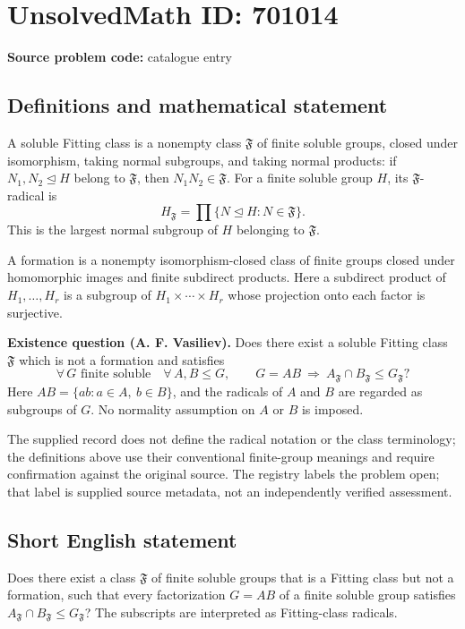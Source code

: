 \documentclass[11pt]{article}
\begin{document}
\section*{UnsolvedMath ID: 701014}
\textbf{Source problem code:} catalogue entry
\subsection{Definitions and mathematical statement}
A soluble Fitting class is a nonempty class \(\mathfrak F\) of finite soluble groups, closed under isomorphism, taking normal subgroups, and taking normal products: if \(N_1,N_2\trianglelefteq H\) belong to \(\mathfrak F\), then \(N_1N_2\in\mathfrak F\). For a finite soluble group \(H\), its \(\mathfrak F\)-radical is
\[
H_{\mathfrak F}=\prod\{N\trianglelefteq H:N\in\mathfrak F\}.
\]
This is the largest normal subgroup of \(H\) belonging to \(\mathfrak F\).

A formation is a nonempty isomorphism-closed class of finite groups closed under homomorphic images and finite subdirect products. Here a subdirect product of \(H_1,\ldots,H_r\) is a subgroup of \(H_1\times\cdots\times H_r\) whose projection onto each factor is surjective.

\textbf{Existence question (A. F. Vasiliev).} Does there exist a soluble Fitting class \(\mathfrak F\) which is not a formation and satisfies
\[
\forall\,G\text{ finite soluble}\quad
\forall\,A,B\leq G,\qquad
G=AB\ \Longrightarrow\
A_{\mathfrak F}\cap B_{\mathfrak F}\leq G_{\mathfrak F}?
\]
Here \(AB=\{ab:a\in A,\ b\in B\}\), and the radicals of \(A\) and \(B\) are regarded as subgroups of \(G\). No normality assumption on \(A\) or \(B\) is imposed.

The supplied record does not define the radical notation or the class terminology; the definitions above use their conventional finite-group meanings and require confirmation against the original source. The registry labels the problem open; that label is supplied source metadata, not an independently verified assessment.
\subsection{Short English statement}
Does there exist a class \(\mathfrak F\) of finite soluble groups that is a Fitting class but not a formation, such that every factorization \(G=AB\) of a finite soluble group satisfies \(A_{\mathfrak F}\cap B_{\mathfrak F}\leq G_{\mathfrak F}\)? The subscripts are interpreted as Fitting-class radicals.
\end{document}
